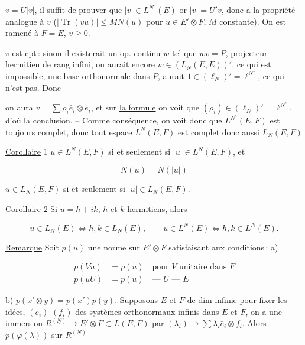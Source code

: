 $v=U|v|$, il suffit de prouver que $|v|\in L^{N^\circ}(E)$ or $|v|=U'v$, donc a la  propriété analogue à $v$ ($|\operatorname{Tr}(vu)|\leq M N(u)$ pour $u\in E'\otimes F$, $M$ constante). On est ramené à $F=E$, $v\geq 0$.

$v$ est cpt\,: sinon il existerait un op. continu $w$ tel que  $wv=P$, projecteur hermitien de rang infini,  on aurait encore $w\in(L_N(E,E))'$, ce qui est impossible,   une base orthonormale dans $P$,  aurait  $1\in(\ell_N)'=\ell^{N^\circ}$, ce qui n'est pas. Donc

on aura $v=\sum\rho_i\bar e_i\otimes e_i$, et sur \uline{la  formule} on voit que $(\rho_i)\in(\ell_N)'=\ell^{N^\circ}$, d'où la conclusion. -- Comme conséquence, on voit donc que $L^{N^\circ}(E,F)$ est \uline{toujours} complet, donc tout espace $L^N(E,F)$ est complet donc aussi $L_N(E,F)$


\uline{Corollaire} 1 $u\in L^N(E,F)$ si et seulement si $|u|\in L^N(E,F)$, et

\[
N(u)=N(|u|)
\]

$u\in L_N(E,F)$ si et seulement si $|u|\in L_N(E,F)$.


\uline{Corollaire 2} Si $u=h+ik$, $h$ et $k$ hermitiens, alors

\[
u\in L_N(E)\Longleftrightarrow h,k\in L_N(E),\qquad
u\in L^N(E)\Longleftrightarrow h,k\in L^N(E).
\]

\uline{Remarque} Soit $p(u)$ une norme sur $E'\otimes F$ satisfaisant aux conditions\,: a)

\[
\begin{aligned}
p(Vu)&=p(u)\quad\text{pour $V$ unitaire dans $F$}\\
p(uU)&=p(u)\quad\text{--- $U$ --- $E$}
\end{aligned}
\]

b) $p(x'\otimes y)=p(x')p(y)$. Supposons $E$ et $F$ de dim infinie pour fixer les idées,  $(e_i)$ $(f_i)$ des systèmes orthonormaux infinis dans $E$ et $F$, on a une immersion $R^{(\underline N)}\to E'\otimes F\subset L(E,F)$ par $(\lambda_i)\to\sum\lambda_i\bar e_i\otimes f_i$. Alors $p(\varphi(\lambda))$ sur $R^{(N)}$

